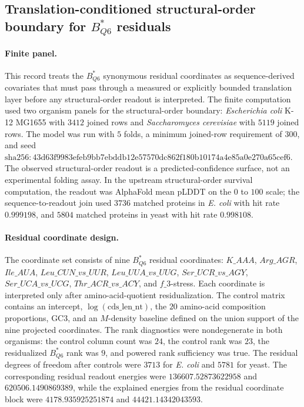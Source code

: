 \subsection{Translation-conditioned structural-order boundary for $B^{\ast}_{Q6}$ residuals}
\label{sec:bior reality-q6-translation-conditioned-structural-order-boundary}

\paragraph{Finite panel.}
This record treats the $B^{\ast}_{Q6}$ synonymous residual coordinates as sequence-derived covariates that must pass through a measured or explicitly bounded translation layer before any structural-order readout is interpreted.  The finite computation used two organism panels for the structural-order boundary: \textit{Escherichia coli} K-12 MG1655 with $3412$ joined rows and \textit{Saccharomyces cerevisiae} with $5119$ joined rows.  The model was run with $5$ folds, a minimum joined-row requirement of $300$, and seed $\mathrm{sha256{:}43d63f9983efeb9bb7ebddb12e57570dc862f180b10174a4e85a0e270a65cef6}$.  The observed structural-order readout is a predicted-confidence surface, not an experimental folding assay.  In the upstream structural-order survival computation, the readout was AlphaFold mean pLDDT on the $0$ to $100$ scale; the sequence-to-readout join used $3736$ matched proteins in \textit{E. coli} with hit rate $0.999198$, and $5804$ matched proteins in yeast with hit rate $0.998108$.

\paragraph{Residual coordinate design.}
The coordinate set consists of nine $B^{\ast}_{Q6}$ residual coordinates: $K\_{AAA}$, $Arg\_{AGR}$, $Ile\_{AUA}$, $Leu\_{CUN\_vs\_UUR}$, $Leu\_{UUA\_vs\_UUG}$, $Ser\_{UCR\_vs\_AGY}$, $Ser\_{UCA\_vs\_UCG}$, $Thr\_{ACR\_vs\_ACY}$, and $f\_3$-stress.  Each coordinate is interpreted only after amino-acid-quotient residualization.  The control matrix contains an intercept, $\log(\mathrm{cds\_len\_nt})$, the $20$ amino-acid composition proportions, GC3, and an $M$-density baseline defined on the union support of the nine projected coordinates.  The rank diagnostics were nondegenerate in both organisms: the control column count was $24$, the control rank was $23$, the residualized $B^{\ast}_{Q6}$ rank was $9$, and powered rank sufficiency was true.  The residual degrees of freedom after controls were $3713$ for \textit{E. coli} and $5781$ for yeast.  The corresponding residual readout energies were $136607.52873622958$ and $620506.1490869389$, while the explained energies from the residual coordinate block were $4178.935925251874$ and $44421.14342043593$.

